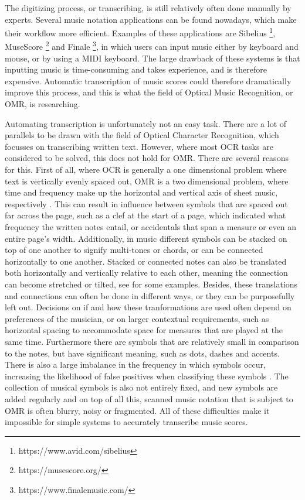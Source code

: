The digitizing process, or transcribing, is still relatively often done manually by experts. Several music notation applications can be found nowadays, which make their workflow more efficient. Examples of these applications are Sibelius \footnote{https://www.avid.com/sibelius}, MuseScore \footnote{https://musescore.org/} and Finale \footnote{https://www.finalemusic.com/}, in which users can input music either by keyboard and mouse, or by using a MIDI keyboard. The large drawback of these systems is that inputting music is time-consuming and takes experience, and is therefore expensive. Automatic transcription of music scores could therefore dramatically improve this process, and this is what the field of Optical Music Recognition, or OMR, is researching.

Automating transcription is unfortunately not an easy task. There are a lot of parallels to be drawn with the field of Optical Character Recognition, which focusses on transcribing written text. However, where most OCR tasks are considered to be solved, this does not hold for OMR. There are several reasons for this. First of all, where OCR is generally a one dimensional problem where text is vertically evenly spaced out, OMR is a two dimensional problem, where time and frequency make up the horizontal and vertical axis of sheet music, respectively \citep{Bainbridge2001, Byrd2015}. This can result in influence between symbols that are spaced out far across the page, such as a clef at the start of a page, which indicated what frequency the written notes entail, or accidentals that span a measure or even an entire page's width. Additionally, in music different symbols can be stacked on top of one another to signify multi-tones or chords, or can be connected horizontally to one another. Stacked or connected notes can also be translated both horizontally and vertically relative to each other, meaning the connection can become stretched or tilted, see \citep{Bainbridge2001} for some examples. Besides, these translations and connections can often be done in different ways, or they can be purposefully left out. Decisions on if and how these tranformations are used often depend on preferences of the musician, or on larger contextual requirements, such as horizontal spacing to accommodate space for measures that are played at the same time. Furthermore there are symbols that are relatively small in comparison to the notes, but have significant meaning, such as dots, dashes and accents. There is also a large imbalance in the frequency in which symbols occur, increasing the likelihood of false positives when classifying these symbols \citep{Chen2016b}. The collection of musical symbols is also not entirely fixed, and new symbols are added regularly \citep{Fujinaga1996} and on top of all this, scanned music notation that is subject to OMR is often blurry, noisy or fragmented. All of these difficulties make it impossible for simple systems to accurately transcribe music scores.

